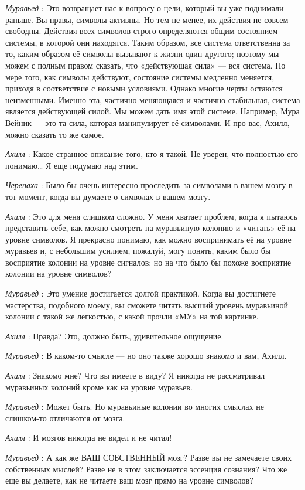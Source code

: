 \documentclass[../main.tex]{subfiles}
\begin{document}
\begin{dialogue}
\emph{Муравьед} : Это возвращает нас к вопросу о цели, который вы уже поднимали раньше. Вы правы, символы активны. Но тем не менее, их действия не совсем свободны. Действия всех символов строго определяются общим состоянием системы, в которой они находятся. Таким образом, все система ответственна за то, каким образом её символы вызывают к жизни один другого; поэтому мы можем с полным правом сказать, что «действующая сила» --- вся система. По мере того, как символы действуют, состояние системы медленно меняется, приходя в соответствие с новыми условиями. Однако многие черты остаются неизменными. Именно эта, частично меняющаяся и частично стабильная, система является действующей силой. Мы можем дать имя этой системе. Например, Мура Вейник --- это та сила, которая манипулирует её символами. И про вас, Ахилл, можно сказать то же самое.

\emph{Ахилл} : Какое странное описание того, кто я такой. Не уверен, что полностью его понимаю\ldots{} Я еще подумаю над этим.

\emph{Черепаха} : Было бы очень интересно проследить за символами в вашем мозгу в тот момент, когда вы думаете о символах в вашем мозгу.

\emph{Ахилл} : Это для меня слишком сложно. У меня хватает проблем, когда я пытаюсь представить себе, как можно смотреть на муравьиную колонию и «читать» её на уровне символов. Я прекрасно понимаю, как можно воспринимать её на уровне муравьев и, с небольшим усилием, пожалуй, могу понять, каким было бы восприятие колонии на уровне сигналов; но на что было бы похоже восприятие колонии на уровне символов?

\emph{Муравьед} : Это умение достигается долгой практикой. Когда вы достигнете мастерства, подобного моему, вы сможете читать высший уровень муравьиной колонии с такой же легкостью, с какой прочли «МУ» на той картинке.

\emph{Ахилл} : Правда? Это, должно быть, удивительное ощущение.

\emph{Муравьед} : В каком-то смысле --- но оно также хорошо знакомо и вам, Ахилл.

\emph{Ахилл} : Знакомо мне? Что вы имеете в виду? Я никогда не рассматривал муравьиных колоний кроме как на уровне муравьев.

\emph{Муравьед} : Может быть. Но муравьиные колонии во многих смыслах не слишком-то отличаются от мозга.

\emph{Ахилл} : И мозгов никогда не видел и не читал!

\emph{Муравьед} : А как же ВАШ СОБСТВЕННЫЙ мозг? Разве вы не замечаете своих собственных мыслей? Разве не в этом заключается эссенция сознания? Что же еще вы делаете, как не читаете ваш мозг прямо на уровне символов?


\end{dialogue}
\end{document}
